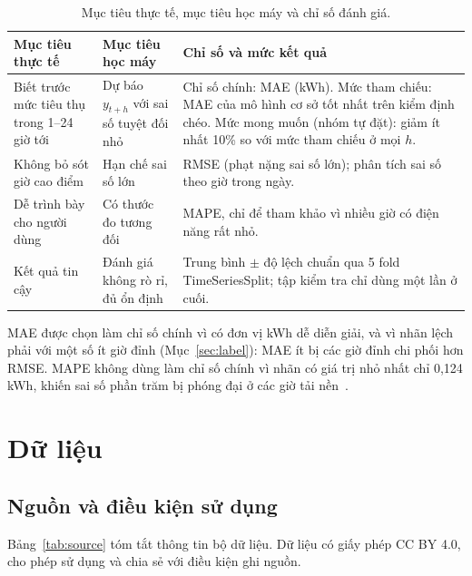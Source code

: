 \begin{table}[htbp]
    \centering
    \caption{Mục tiêu thực tế, mục tiêu học máy và chỉ số đánh giá.}
    \label{tab:objectives}
    \small
    \begin{tabularx}{\textwidth}{|>{\raggedright\arraybackslash}p{3.6cm}|>{\raggedright\arraybackslash}p{3.8cm}|>{\raggedright\arraybackslash}X|}
        \hline
        \textbf{Mục tiêu thực tế} & \textbf{Mục tiêu học máy} & \textbf{Chỉ số và mức kết quả} \\ \hline
        Biết trước mức tiêu thụ trong 1--24 giờ tới & Dự báo $y_{t+h}$ với sai số tuyệt đối nhỏ & Chỉ số chính: MAE (kWh). Mức tham chiếu: MAE của mô hình cơ sở tốt nhất trên kiểm định chéo. Mức mong muốn (nhóm tự đặt): giảm ít nhất 10\% so với mức tham chiếu ở mọi $h$. \\ \hline
        Không bỏ sót giờ cao điểm & Hạn chế sai số lớn & RMSE (phạt nặng sai số lớn); phân tích sai số theo giờ trong ngày. \\ \hline
        Dễ trình bày cho người dùng & Có thước đo tương đối & MAPE, chỉ để tham khảo vì nhiều giờ có điện năng rất nhỏ. \\ \hline
        Kết quả tin cậy & Đánh giá không rò rỉ, đủ ổn định & Trung bình $\pm$ độ lệch chuẩn qua 5 fold TimeSeriesSplit; tập kiểm tra chỉ dùng một lần ở cuối. \\ \hline
    \end{tabularx}
\end{table}

MAE được chọn làm chỉ số chính vì có đơn vị kWh dễ diễn giải, và vì nhãn lệch phải với một số ít giờ đỉnh (Mục~\ref{sec:label}): MAE ít bị các giờ đỉnh chi phối hơn RMSE. MAPE không dùng làm chỉ số chính vì nhãn có giá trị nhỏ nhất chỉ 0,124 kWh, khiến sai số phần trăm bị phóng đại ở các giờ tải nền~\cite{hyndman2021fpp3,hyndman2006another}.

\section{Dữ liệu}
\label{sec:dataset}

\subsection{Nguồn và điều kiện sử dụng}
Bảng~\ref{tab:source} tóm tắt thông tin bộ dữ liệu. Dữ liệu có giấy phép CC BY 4.0, cho phép sử dụng và chia sẻ với điều kiện ghi nguồn.

